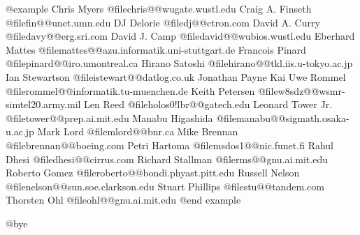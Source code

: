@example
Chris Myers @file{chris@@wugate.wustl.edu}
Craig A. Finseth @file{fin@@unet.umn.edu}
DJ Delorie @file{dj@@ctron.com}
David A. Curry @file{davy@@erg.sri.com}
David J. Camp @file{david@@wubios.wustl.edu}
Eberhard Mattes @file{mattes@@azu.informatik.uni-stuttgart.de}
Francois Pinard @file{pinard@@iro.umontreal.ca}
Hirano Satoshi @file{hirano@@tkl.iis.u-tokyo.ac.jp}
Ian Stewartson @file{istewart@@datlog.co.uk}
Jonathan Payne
Kai Uwe Rommel @file{rommel@@informatik.tu-muenchen.de}
Keith Petersen @file{w8sdz@@wsmr-simtel20.army.mil}
Len Reed @file{holos0!lbr@@gatech.edu}
Leonard Tower Jr. @file{tower@@prep.ai.mit.edu}
Manabu Higashida @file{manabu@@sigmath.osaka-u.ac.jp}
Mark Lord @file{mlord@@bnr.ca}
Mike Brennan @file{brennan@@boeing.com}
Petri Hartoma @file{msdos1@@nic.funet.fi}
Rahul Dhesi @file{dhesi@@cirrus.com}
Richard Stallman @file{rms@@gnu.ai.mit.edu}
Roberto Gomez @file{roberto@@bondi.phyast.pitt.edu}
Russell Nelson @file{nelson@@sun.soe.clarkson.edu}
Stuart Phillips @file{stu@@tandem.com}
Thorsten Ohl @file{ohl@@gnu.ai.mit.edu}
@end example

@bye
